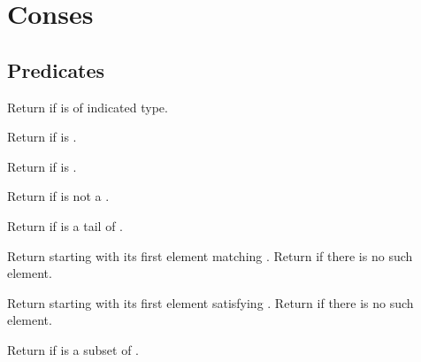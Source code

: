 %
%

\section{Conses} 

\subsection{Predicates} 
\begin{LIST}{1cm}

  {
    Return \retval{\T} if  is of indicated type.
    }

  {
  Return \retval{\T} if  is \NIL.
  }

  {Return \retval{\T} if  is \NIL.
    }

  {Return \retval{\T} if  is not a
  . 
  }

  {
  Return \retval{\T} if  is a tail of .
  }

  {
  Return  starting with
  its first element matching . Return \retval{\NIL} if
  there is no such element.
  }

  {
  Return  starting with
  its first element satisfying . Return \retval{\NIL} if
  there is no such element.
  }

  {
  Return \retval{\T} if  is a subset of
  .
  }

\end{LIST}


